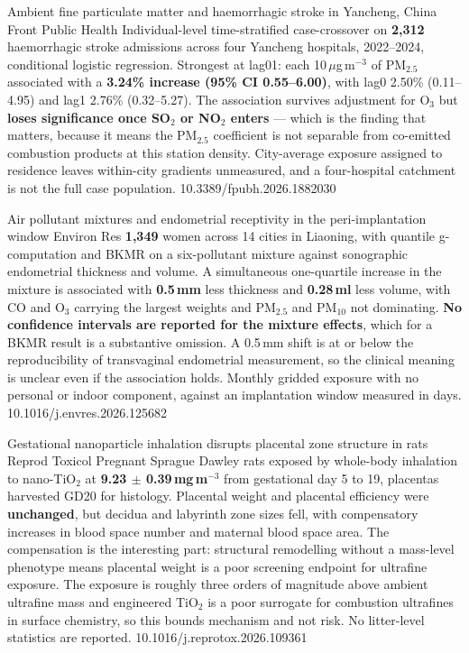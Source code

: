 \documentclass[10pt]{article}
\begin{document}

{Ambient fine particulate matter and haemorrhagic stroke in Yancheng, China}
{Front Public Health}
{Individual-level time-stratified case-crossover on \textbf{2{,}312} haemorrhagic stroke
admissions across four Yancheng hospitals, 2022--2024, conditional logistic regression.
Strongest at lag01: each 10\,$\mu$g\,m$^{-3}$ of PM$_{2.5}$ associated with a
\textbf{3.24\% increase (95\% CI 0.55--6.00)}, with lag0 2.50\% (0.11--4.95) and lag1
2.76\% (0.32--5.27). The association survives adjustment for O$_3$ but \textbf{loses
significance once SO$_2$ or NO$_2$ enters} --- which is the finding that matters, because
it means the PM$_{2.5}$ coefficient is not separable from co-emitted combustion products
at this station density. City-average exposure assigned to residence leaves within-city
gradients unmeasured, and a four-hospital catchment is not the full case population.}
{10.3389/fpubh.2026.1882030}


{Air pollutant mixtures and endometrial receptivity in the peri-implantation window}
{Environ Res}
{\textbf{1{,}349} women across 14 cities in Liaoning, with quantile g-computation and BKMR
on a six-pollutant mixture against sonographic endometrial thickness and volume. A
simultaneous one-quartile increase in the mixture is associated with \textbf{0.5\,mm} less
thickness and \textbf{0.28\,ml} less volume, with CO and O$_3$ carrying the largest
weights and PM$_{2.5}$ and PM$_{10}$ not dominating. \textbf{No confidence intervals are
reported for the mixture effects}, which for a BKMR result is a substantive omission. A
0.5\,mm shift is at or below the reproducibility of transvaginal endometrial measurement,
so the clinical meaning is unclear even if the association holds. Monthly gridded exposure
with no personal or indoor component, against an implantation window measured in days.}
{10.1016/j.envres.2026.125682}


{Gestational nanoparticle inhalation disrupts placental zone structure in rats}
{Reprod Toxicol}
{Pregnant Sprague Dawley rats exposed by whole-body inhalation to nano-TiO$_2$ at
\textbf{9.23 $\pm$ 0.39\,mg\,m$^{-3}$} from gestational day 5 to 19, placentas harvested
GD20 for histology. Placental weight and placental efficiency were \textbf{unchanged}, but
decidua and labyrinth zone sizes fell, with compensatory increases in blood space number
and maternal blood space area. The compensation is the interesting part: structural
remodelling without a mass-level phenotype means placental weight is a poor screening
endpoint for ultrafine exposure. The exposure is roughly three orders of magnitude above
ambient ultrafine mass and engineered TiO$_2$ is a poor surrogate for combustion
ultrafines in surface chemistry, so this bounds mechanism and not risk. No litter-level
statistics are reported.}
{10.1016/j.reprotox.2026.109361}
\end{document}
